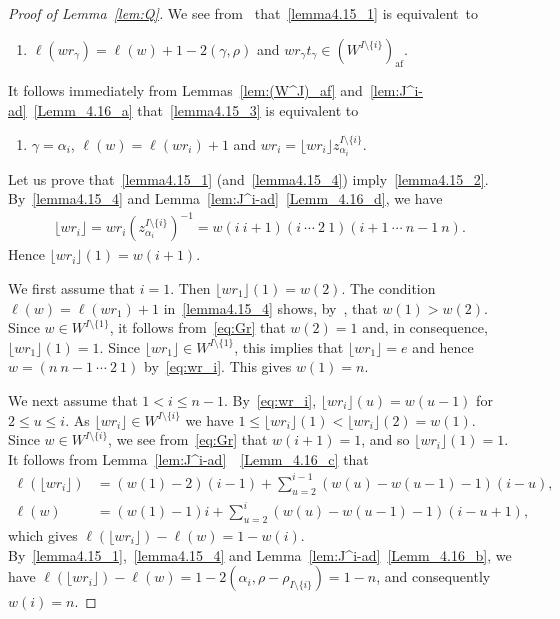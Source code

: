 \documentclass[ALCO,ThmDefs,Unicode,epreuves]{cedram}
\DeclareMathOperator{\af}{af}
\begin{document}
\begin{proof}[Proof of Lemma~\ref{lem:Q}]
We see from~\cite[Proof of Theorem~10.16]{LS} 
that~\ref{lemma4.15_1} is equivalent~to 
\begin{enumerate}[label=(\arabic*),resume*=lemma4.15]
\item\label{lemma4.15_3} %
$\ell(w r_{\gamma}) = \ell(w) + 1 - 2(\gamma,\rho)$
and
$w r_{\gamma}t_{\gamma} \in (W^{I \setminus \{ i \}})_{\af}$.
\end{enumerate}
It follows immediately from Lemmas~\ref{lem:(W^J)_af} 
and~\ref{lem:J^i-ad}~\ref{Lemm_4.16_a} 
that~\ref{lemma4.15_3} is equivalent to 
\begin{enumerate}[label=(\arabic*),resume*=lemma4.15]
\item\label{lemma4.15_4} %
$\gamma = \alpha_i$, 
$\ell(w) = \ell(w r_i) + 1$ 
and
$w r_i = \lfloor w r_i \rfloor z_{\alpha_i}^{I \setminus \{ i \}}$.
\end{enumerate}

Let us prove that~\ref{lemma4.15_1} (and~\ref{lemma4.15_4}) imply~\ref{lemma4.15_2}. 
By~\ref{lemma4.15_4} and Lemma~\ref{lem:J^i-ad}~\ref{Lemm_4.16_d}, 
we have
\begin{align} \label{eq:wr_i}
\lfloor w r_i \rfloor = w r_i (z_{\alpha_i}^{I \setminus \{ i \}})^{-1} 
= w(i \ i+1)(i \ \cdots \ 2 \ 1)(i+1 \ \cdots \ n-1 \ n) .
\end{align}
Hence 
$\lfloor w r_i \rfloor (1) = w(i+1)$.

We first assume that $i=1$. 
Then 
$\lfloor w r_1 \rfloor (1) = w(2)$. 
The condition 
$\ell(w) = \ell(w r_1) + 1$ in~\ref{lemma4.15_4}
shows, 
by~\cite[Proposition~1.5.3]{BB}, 
that 
$w(1) > w(2)$. 
Since $w \in W^{I \setminus \{ 1 \}}$, 
it follows from~\eqref{eq:Gr} that 
$w(2) = 1$ 
and, in consequence, 
$\lfloor w r_1 \rfloor (1) = 1$. 
Since 
$\lfloor w r_1 \rfloor \in W^{I \setminus \{ 1 \}}$, 
this implies that 
$\lfloor w r_1 \rfloor = e$ 
and hence 
$w = (n \ n-1 \ \cdots \ 2 \ 1)$ 
by~\eqref{eq:wr_i}. 
This gives 
$w(1) = n$. 

We next assume that 
$1 < i \leq n-1$. 
By~\eqref{eq:wr_i}, 
$\lfloor w r_i \rfloor (u) = w(u-1)$ 
for $2 \leq u \leq i$.
As 
$\lfloor wr_i \rfloor \in W^{I \setminus \{ i \}}$ 
we have
$1 \leq \lfloor wr_i \rfloor (1) < \lfloor wr_i \rfloor (2) = w(1)$. 
Since $w \in W^{I \setminus \{ i \}}$, 
we see from~\eqref{eq:Gr} that 
$w(i+1) = 1$, 
and so 
$\lfloor w r_i \rfloor (1) = 1$. 
It follows from Lemma~\ref{lem:J^i-ad}~~\ref{Lemm_4.16_c} that 
\begin{align}
\ell(\lfloor w r_i \rfloor) 
&= 
(w(1) - 2)(i-1) + \sum_{u=2}^{i-1} \left( w(u) - w(u-1) - 1 \right) (i-u), \\[2mm]
\ell(w) 
&= 
(w(1) - 1)i + \sum_{u=2}^i \left( w(u) - w(u-1) - 1 \right) (i-u+1) ,
\end{align}
which gives 
$\ell(\lfloor w r_i \rfloor) - \ell(w) = 1 - w(i)$. 
By~\ref{lemma4.15_1},~\ref{lemma4.15_4} and Lemma~\ref{lem:J^i-ad}~\ref{Lemm_4.16_b}, 
we have 
$\ell(\lfloor w r_i \rfloor) - \ell(w) = 1 - 2(\alpha_i, \rho-\rho_{I \setminus \{ i \}}) = 1-n$, 
and consequently $w(i) = n$. 


\end{proof}
\end{document}
